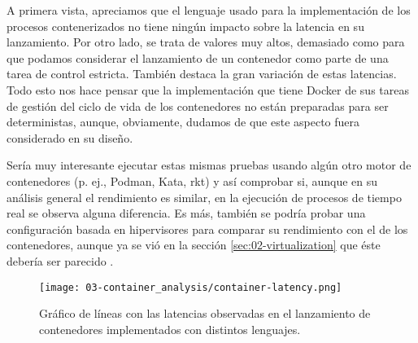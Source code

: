 A primera vista, apreciamos que el lenguaje usado para la implementación de los
procesos contenerizados no tiene ningún impacto sobre la latencia en su
lanzamiento. Por otro lado, se trata de valores muy altos, demasiado como para
que podamos considerar el lanzamiento de un contenedor como parte de una tarea
de control estricta. También destaca la gran variación de estas latencias. Todo esto
nos hace pensar que la implementación que tiene Docker de sus tareas de gestión
del ciclo de vida de los contenedores no están preparadas para ser
deterministas, aunque, obviamente, dudamos de que este aspecto fuera considerado
en su diseño.

Sería muy interesante ejecutar estas mismas pruebas usando algún otro motor de
contenedores (p. ej., Podman, Kata, rkt) y así comprobar si, aunque en su
análisis general el rendimiento es similar, en la ejecución de procesos de
tiempo real se observa alguna diferencia. Es más, también se podría probar una
configuración basada en hipervisores para comparar su rendimiento con el de los
contenedores, aunque ya se vió en la sección \ref{sec:02-virtualization} que
éste debería ser parecido \cite{manco_my_2017} \cite{felter_updated_2015}.

\begin{figure}
    \centering
    \texttt{[image: 03-container\_analysis/container-latency.png]}
    \caption{Gráfico de líneas con las latencias observadas en el lanzamiento de
        contenedores implementados con distintos lenguajes.}
    \label{fig:03-container_latency}
\end{figure}